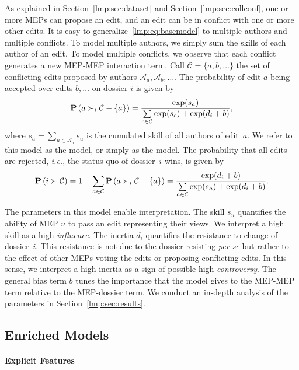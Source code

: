 As explained in Section~\ref{lmp:sec:dataset} and Section~\ref{lmp:sec:collconf}, one or more MEPs can propose an edit, and an edit can be in conflict with one or more other edits.
It is easy to generalize~\eqref{lmp:eq:basemodel} to multiple authors and multiple conflicts.
To model multiple authors, we simply sum the skills of each author of an edit.
To model multiple conflicts, we observe that each conflict generates a new MEP-MEP interaction term.
Call \mbox{$\mathcal{C} = \{ a, b, \dots \}$} the set of conflicting edits proposed by authors $ \mathcal{A}_a, \mathcal{A}_b, \dots $.
The probability of edit $a$ being accepted over edits $b, \dots$ on dossier $i$ is given by
\begin{equation}
	\label{lmp:eq:wowmodel}
	\mathbf{P}\left(  a \succ_i \mathcal{C} - \{ a\}  \right) =
	\frac{\exp(s_a) }{ \sum\limits_{c \in \mathcal{C} } \exp(s_c) + \exp(d_i + b) },
\end{equation}
where $s_a = \sum_{u \in \mathcal{A}_a} s_u$ is the cumulated skill of all authors of edit~$a$.
We refer to this model as the \warofwords{} model, or simply as the \wow{} model.
The probability that all edits are rejected, \textit{i.e.}, the status quo of dossier~$i$ wins, is given by
\begin{equation*}
	\mathbf{P}\left( i \succ \mathcal{C}  \right)
	= 1 - \sum_{a \in \mathcal{C} } \mathbf{P}\left(  a \succ_i \mathcal{C} - \{ a \} \right)
	= \frac{\exp(d_i + b) }{ \sum\limits_{a \in \mathcal{C} } \exp(s_a) + \exp(d_i + b) }.
\end{equation*}

The parameters in this model enable interpretation.
The skill $s_u$ quantifies the ability of MEP $u$ to pass an edit representing their views.
We interpret a high skill as a high \textit{influence}.
The inertia $d_i$ quantifies the resistance to change of dossier~$i$.
This resistance is not due to the dossier resisting \textit{per se} but rather to the effect of other MEPs voting the edits or proposing conflicting edits.
In this sense, we interpret a high inertia as a sign of possible high \textit{controversy}.
The general bias term $b$ tunes the importance that the model gives to the MEP-MEP term relative to the MEP-dossier term.
We conduct an in-depth analysis of the parameters in Section~\ref{lmp:sec:results}.


\subsection{Enriched Models}
\label{lmp:sec:enriched}

\paragraph{Explicit Features}

